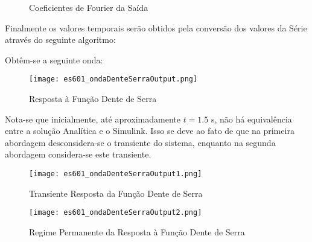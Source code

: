 \documentclass{article}
\begin{document}
\begin{resolution}
\begin{figure}[H]
            \caption{Coeficientes de Fourier da Saída}
        \end{figure}
\newpage
        Finalmente os valores temporais serão obtidos pela conversão dos valores da Série através do seguinte algoritmo:
        \begin{scriptsize}
            \myOctave
        \end{scriptsize} 
        Obtêm-se a seguinte onda:
        \begin{figure}[H]
            \centering
            \texttt{[image: es601\_ondaDenteSerraOutput.png]}
            \caption{Resposta à Função Dente de Serra}
        \end{figure}
        Nota-se que inicialmente, até aproximadamente $t = 1.5$ s, não há equivalência entre a solução Analítica e o Simulink. Isso se deve ao fato de que na primeira abordagem desconsidera-se o transiente do sistema, enquanto na segunda abordagem considera-se este transiente.
\newpage
    \begin{figure}[H]
        \centering
        \texttt{[image: es601\_ondaDenteSerraOutput1.png]}
        \caption{Transiente Resposta da Função Dente de Serra}
    \end{figure}
    \begin{figure}[H]
        \centering
        \texttt{[image: es601\_ondaDenteSerraOutput2.png]}
        \caption{Regime Permanente da Resposta à Função Dente de Serra}
    \end{figure}
    \end{resolution}
\end{document}
